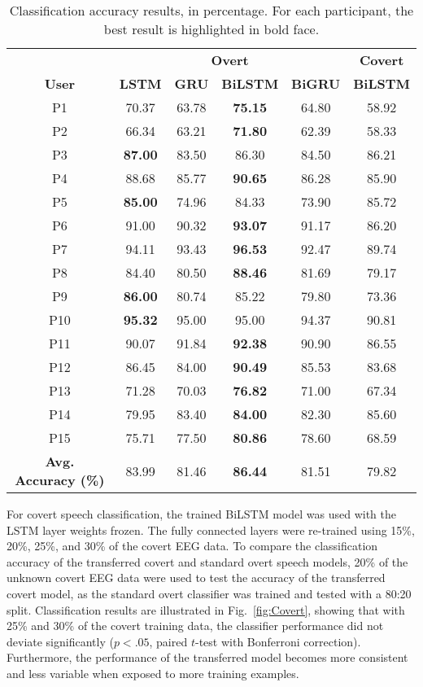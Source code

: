 \documentclass[onecolumn]{IEEEtran}
\newcommand{\best}[1]{\textbf{#1}}
\begin{document}
\begin{table}[!ht]
\centering
\caption{
Classification accuracy results, in percentage.
For each participant, the best result is highlighted in bold face.
}
\label{tab:results}
\begin{tabular}{*6c}
\toprule
    & \multicolumn{4}{c}{\textbf{Overt}} & \textbf{Covert} \\ 
    \cmidrule(rl){2-5} 
 \textbf{User} & \textbf{LSTM} & \textbf{GRU} & \textbf{BiLSTM} & \textbf{BiGRU} & \textbf{BiLSTM} \\ 
 \midrule
P1   & 70.37 & 63.78 & \best{75.15} & 64.80 & 58.92 \\ %
P2   & 66.34 & 63.21 & \best{71.80} & 62.39 & 58.33 \\ %
P3   & \best{87.00} & 83.50 & 86.30 & 84.50 & 86.21 \\ %
P4   & 88.68 & 85.77 & \best{90.65} & 86.28 & 85.90 \\ %
P5   & \best{85.00} & 74.96 & 84.33 & 73.90 & 85.72 \\ %
P6   & 91.00 & 90.32 & \best{93.07} & 91.17 & 86.20 \\ %
P7   & 94.11 & 93.43 & \best{96.53} & 92.47 & 89.74 \\ %
P8   & 84.40 & 80.50 & \best{88.46} & 81.69 & 79.17 \\ %
P9   & \best{86.00} & 80.74 & 85.22 & 79.80 & 73.36 \\ %
P10  & \best{95.32} & 95.00 & 95.00 & 94.37 & 90.81 \\ %
P11  & 90.07 & 91.84 & \best{92.38} & 90.90 & 86.55 \\ %
P12  & 86.45 & 84.00 & \best{90.49} & 85.53 & 83.68 \\ %
P13  & 71.28 & 70.03 & \best{76.82} & 71.00 & 67.34 \\ %
P14  & 79.95 & 83.40 & \best{84.00} & 82.30 & 85.60 \\ %
P15  & 75.71 & 77.50 & \best{80.86} & 78.60 & 68.59 \\ %
\midrule
\textbf{Avg. Accuracy (\%)} & 83.99 & 81.46 & \best{86.44} & 81.51 & 79.82 \\ 
\bottomrule
\end{tabular}%
\end{table}

For covert speech classification, the trained BiLSTM model was used with the LSTM layer weights frozen. 
The fully connected layers were re-trained using 15\%, 20\%, 25\%, and 30\% of the covert EEG data. 
To compare the classification accuracy of the transferred covert and standard overt speech models, 
20\% of the unknown covert EEG data were used to test the accuracy of the transferred covert model, 
as the standard overt classifier was trained and tested with a 80:20 split. 
Classification results are illustrated in Fig.~\ref{fig:Covert},
showing that with 25\% and 30\% of the covert training data, 
the classifier performance did not deviate significantly ($p<.05$, paired $t$-test with Bonferroni correction). 
Furthermore, the performance of the transferred model becomes more consistent 
and less variable when exposed to more training examples. 
\end{document}
